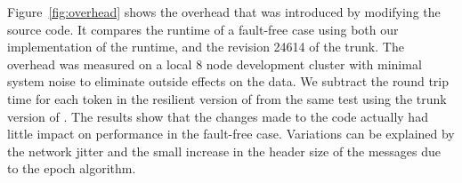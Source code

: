 Figure~\ref{fig:overhead} shows the overhead that was introduced by modifying
the \ompi source code. It compares the runtime of a fault-free case using both
our implementation of the \ompi runtime, and the revision 24614 of the \ompi
trunk. The overhead was measured on a local 8 node development cluster with
minimal system noise to eliminate outside effects on the data. We subtract the
round trip time for each token in the resilient version of \ompi from the same
test using the trunk version of \ompi. The results show that the changes made to
the code actually had little impact on performance in the fault-free case.
Variations can be explained by the network jitter and the small increase in the
header size of the messages due to the epoch algorithm.


